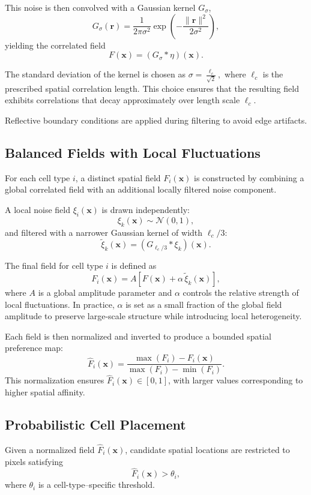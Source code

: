 \documentclass{article}
\begin{document}
This noise is then convolved with a Gaussian kernel $G_\sigma$,
$$
G_\sigma(\mathbf{r}) = \frac{1}{2\pi\sigma^2}
\exp\left(-\frac{\|\mathbf{r}\|^2}{2\sigma^2}\right),
$$
yielding the correlated field
$$
F(\mathbf{x}) = (G_\sigma * \eta)(\mathbf{x}).
$$

The standard deviation of the kernel is chosen as
$
\sigma = \frac{\ell_c}{\sqrt{2}},
$
where $\ell_c$ is the prescribed spatial correlation length. This choice ensures that the resulting field exhibits correlations that decay approximately over length scale $\ell_c$.

Reflective boundary conditions are applied during filtering to avoid edge artifacts.

\subsection{Balanced Fields with Local Fluctuations}

For each cell type $i$, a distinct spatial field $F_i(\mathbf{x})$ is constructed by combining a global correlated field with an additional locally filtered noise component.

A local noise field $\xi_i(\mathbf{x})$ is drawn independently:
$$
\xi_k(\mathbf{x}) \sim \mathcal{N}(0,1),
$$
and filtered with a narrower Gaussian kernel of width $\ell_c/3$:
$$
\tilde{\xi}_k(\mathbf{x}) = (G_{\ell_c/3} * \xi_k)(\mathbf{x}).
$$

The final field for cell type $i$ is defined as
$$
F_i(\mathbf{x}) =
A \left[
F(\mathbf{x}) + \alpha\,\tilde{\xi}_k(\mathbf{x})
\right],
$$
where $A$ is a global amplitude parameter and $\alpha$ controls the relative strength of local fluctuations. In practice, $\alpha$ is set as a small fraction of the global field amplitude to preserve large-scale structure while introducing local heterogeneity.

Each field is then normalized and inverted to produce a bounded spatial preference map:
$$
\hat{F}_i(\mathbf{x}) =
\frac{\max(F_i) - F_i(\mathbf{x})}
{\max(F_i) - \min(F_i)}.
$$
This normalization ensures $\hat{F}_i(\mathbf{x}) \in [0,1]$, with larger values corresponding to higher spatial affinity.

\subsection{Probabilistic Cell Placement}

Given a normalized field $\hat{F}_i(\mathbf{x})$, candidate spatial locations are restricted to pixels satisfying
$$
\hat{F}_i(\mathbf{x}) > \theta_i,
$$
where $\theta_i$ is a cell-type–specific threshold.
\end{document}
